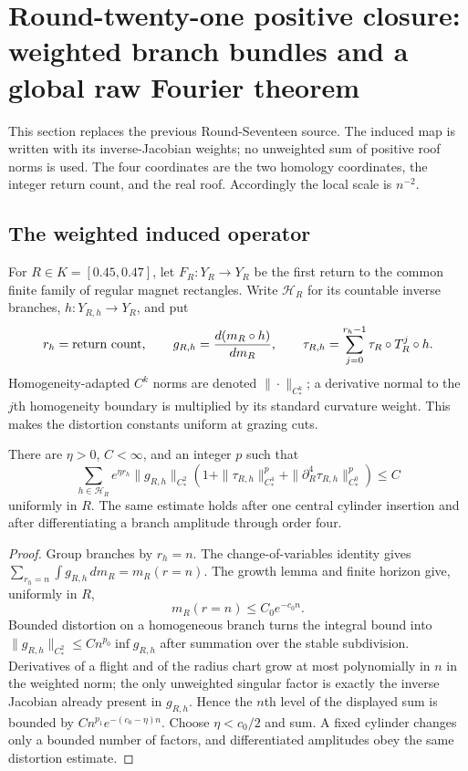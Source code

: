 \section{Round-twenty-one positive closure: weighted branch bundles and a global raw Fourier theorem}
\label{sec:r21-a2}

This section replaces the previous Round-Seventeen source.  The induced map is
written with its inverse-Jacobian weights; no unweighted sum of positive roof
norms is used.  The four coordinates are the two homology coordinates, the
integer return count, and the real roof.  Accordingly the local scale is
$n^{-2}$.

\subsection{The weighted induced operator}

For $R\in K=[0.45,0.47]$, let $F_R:Y_R\to Y_R$ be the first return to the
common finite family of regular magnet rectangles.  Write $\mathcal H_R$ for
its countable inverse branches, $h:Y_{R,h}\to Y_R$, and put
\[
 r_h=\hbox{return count},\qquad
 g_{R,h}={d(m_R\circ h)\over dm_R},\qquad
 \tau_{R,h}=\sum_{j=0}^{r_h-1}\tau_R\circ T_R^j\circ h .
\]
Homogeneity-adapted $C^k$ norms are denoted $\|\cdot\|_{C^k_*}$; a derivative
normal to the $j$th homogeneity boundary is multiplied by its standard
curvature weight.  This makes the distortion constants uniform at grazing
cuts.

\begin{theorem}
\label{thm:r21-a2-complexity}
There are $\eta>0$, $C<\infty$, and an integer $p$ such that
\[
 \sum_{h\in\mathcal H_R}e^{\eta r_h}
 \|g_{R,h}\|_{C^2_*}
 \left(1+\|\tau_{R,h}\|_{C^4_*}^{p}
       +\|\partial_R^4\tau_{R,h}\|_{C^0_*}^{p}\right)
 \le C
\]
uniformly in $R$.  The same estimate holds after one central cylinder
insertion and after differentiating a branch amplitude through order four.
\end{theorem}

\begin{proof}
Group branches by $r_h=n$.  The change-of-variables identity gives
$\sum_{r_h=n}\int g_{R,h}\,dm_R=m_R(r=n)$.  The growth lemma and finite
horizon give, uniformly in $R$,
\[
 m_R(r=n)\le C_0e^{-c_0n}.
\]
Bounded distortion on a homogeneous branch turns the integral bound into
$\|g_{R,h}\|_{C^2_*}\le Cn^{p_0}\inf g_{R,h}$ after summation over the stable
subdivision.  Derivatives of a flight and of the radius chart grow at most
polynomially in $n$ in the weighted norm; the only unweighted singular factor
is exactly the inverse Jacobian already present in $g_{R,h}$.  Hence the
$n$th level of the displayed sum is bounded by
$Cn^{p_1}e^{-(c_0-\eta)n}$.  Choose $\eta<c_0/2$ and sum.  A fixed cylinder
changes only a bounded number of factors, and differentiated amplitudes obey
the same distortion estimate.
\end{proof}

